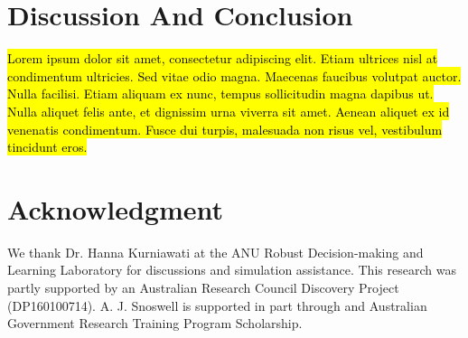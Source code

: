\documentclass[letterpaper, 10 pt, conference]{ieeeconf}
\begin{document}
\section{Discussion And Conclusion}

\hl{Lorem ipsum dolor sit amet, consectetur adipiscing elit. Etiam ultrices nisl at condimentum ultricies. Sed vitae odio magna. Maecenas faucibus volutpat auctor. Nulla facilisi. Etiam aliquam ex nunc, tempus sollicitudin magna dapibus ut. Nulla aliquet felis ante, et dignissim urna viverra sit amet. Aenean aliquet ex id venenatis condimentum. Fusce dui turpis, malesuada non risus vel, vestibulum tincidunt eros.}



\section*{Acknowledgment}

We thank Dr. Hanna Kurniawati at the ANU Robust Decision-making and Learning Laboratory for discussions and simulation assistance.
This research was partly supported by an Australian Research Council Discovery Project (DP160100714).
A. J. Snoswell is supported in part through and Australian Government Research Training Program Scholarship. 




\end{document}
